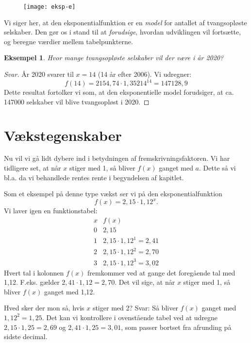 \documentclass[12pt,oneside,a4paper]{article}
\theoremstyle{plain}
\newtheorem*{eks}{Eksempel}
\begin{document}
\begin{figure}[ht]
    \centering
    \texttt{[image: eksp-e]}
    \label{eksp-e}
\end{figure}

Vi siger her, at den eksponentialfunktion er en {\em model} for antallet af
tvangsopløste selskaber. Den gør os i stand til at {\em forudsige}, hvordan
udviklingen vil fortsætte, og beregne værdier mellem tabelpunkterne.

\begin{eks}
    Hvor mange tvangsopløste selskaber vil der være i år 2020?
\end{eks}
\begin{proof}[Svar]
    År 2020 svarer til $x=14$ (14 år efter 2006). Vi udregner:
    $$
    f(14) = 2154,74 \cdot 1,35214^{14} = 147128,9
    $$
    Dette resultat fortolker vi som, at den eksponentielle
    model forudsiger, at ca. 147000 selskaber vil blive tvangsopløst i 2020.
\end{proof}
    

\section*{Vækstegenskaber}
Nu vil vi gå lidt dybere ind i betydningen af fremskrivningsfaktoren. Vi har tidligere
set, at når $x$ stiger med 1, så bliver $f(x)$ ganget med $a$. Dette så vi bl.a. da
vi behandlede rentes rente i begyndelsen af kapitlet.

Som et eksempel på denne type vækst ser vi på den eksponentialfunktion
$$
f(x) = 2,15 \cdot 1,12^x.
$$
Vi laver igen en funktionstabel:
$$
\begin{array}{r|l}
    x & f(x) \\
    \hline
    0 & 2,15 \\
    1 & 2,15 \cdot 1,12^1 = 2,41 \\
    2 & 2,15 \cdot 1,12^2 = 2,70 \\
    3 & 2,15 \cdot 1,12^3 = 3,02
\end{array}
$$
Hvert tal i kolonnen $f(x)$ fremkommer ved at gange det foregående tal med
1,12. F.eks. gælder $2,41 \cdot 1,12 = 2,70$. Det vil sige, at når $x$ stiger
med 1, så bliver $f(x)$ ganget med 1,12.

Hved sker der mon så, hvis $x$ stiger med 2? Svar: Så bliver $f(x)$ ganget med
$1,12^2 = 1,25$.  Det kan vi kontrollere i ovenstående tabel ved at udregne
$2,15\cdot1,25 = 2,69$ og $2,41\cdot1,25 = 3,01$, som passer bortset fra afrunding på
sidste decimal.
\end{document}
